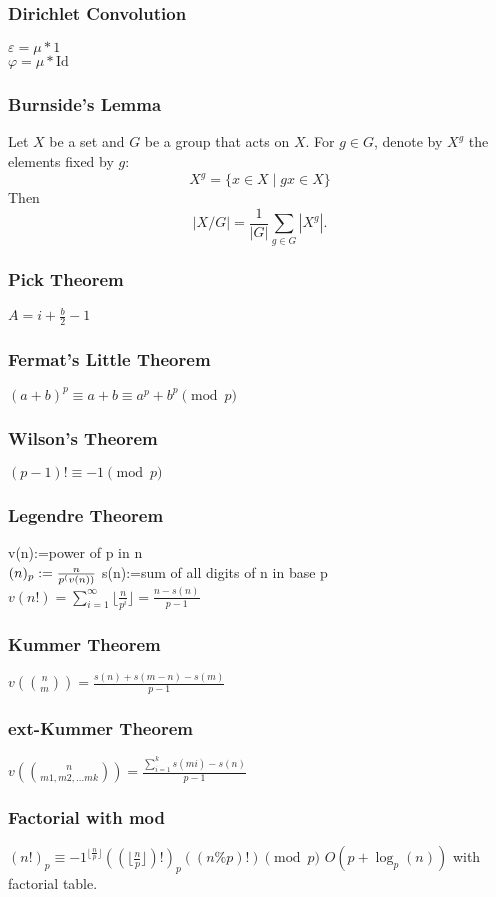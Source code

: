 \subsubsection{Dirichlet Convolution}
    $\varepsilon = \mu * 1$\\
    $\varphi = \mu * \text{Id}$
\subsubsection{Burnside's Lemma}
Let $X$ be a set and $G$ be a group that acts on $X$.
For $g \in G$, denote by $X^g$ the elements fixed by $g$:
\[
X^g = \{ x \in X \mid gx \in X \}
\]
Then
\[
|X/G| = \frac{1}{|G|} \sum_{g \in G} |X^g|.
\]
\subsubsection{Pick Theorem}
    $A = i + \frac{b}{2} - 1$

\subsubsection{Fermat's Little Theorem}
    $(a+b)^p \equiv a+b \equiv a^p+b^p \pmod p$
\subsubsection{Wilson's Theorem}
    $(p-1)! \equiv -1 \pmod p$
\subsubsection{Legendre Theorem}
    v(n):=power of p in n\\
    $(n)_p:=\frac{n}{p^(v(n))}\\$
    s(n):=sum of all digits of n in base p\\
    $v(n!)=\sum_{i=1}^\infty \lfloor \frac n {p^i} \rfloor=\frac{n-s(n)}{p-1}$
\subsubsection{Kummer Theorem}
    $v(\binom{n}{m})=\frac{s(n)+s(m-n)-s(m)}{p-1}$
\subsubsection{ext-Kummer Theorem}
    $v(\binom{n}{{m1,m2,...mk}})=\frac{\sum_{i=1}^k s(mi)-s(n)}{p-1}$
\subsubsection{Factorial with mod}
    $(n!)_p \equiv -1^{\lfloor \frac n p\rfloor}((\lfloor \frac n p\rfloor)!)_p((n\%p)!) \pmod p$
    $O(p+\log_p(n))$ with factorial table.

